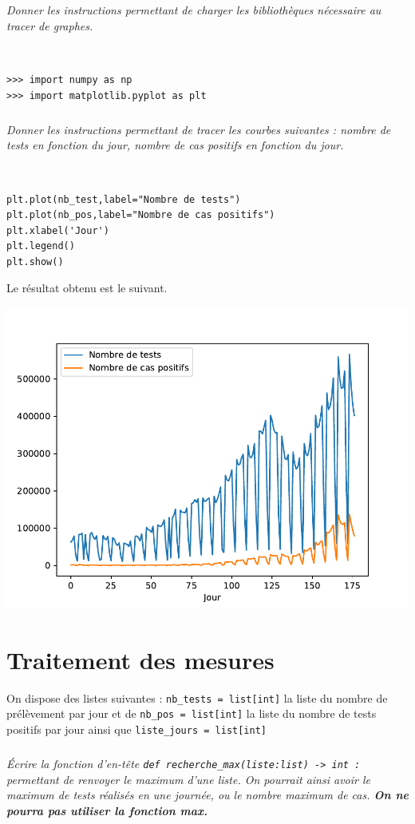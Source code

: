 \documentclass[10pt,fleqn]{article} %
\begin{document}
\subparagraph{}
\textit{Donner les instructions permettant de charger les bibliothèques nécessaire au tracer de graphes.}
\ifprof
\begin{corrige}~\\
\begin{lstlisting}
>>> import numpy as np
>>> import matplotlib.pyplot as plt
\end{lstlisting}
\end{corrige}
\else
\fi


\subparagraph{}
\textit{Donner les instructions permettant de tracer les courbes suivantes : nombre de tests en fonction du jour, nombre de cas positifs en fonction du jour.}
\ifprof
\begin{corrige}~\\
\begin{lstlisting}
plt.plot(nb_test,label="Nombre de tests")
plt.plot(nb_pos,label="Nombre de cas positifs")
plt.xlabel('Jour')
plt.legend()
plt.show()
\end{lstlisting}
\end{corrige}
\else
\fi

Le résultat obtenu est le suivant. 


\begin{center}
\includegraphics[width=.6\linewidth]{images/Figure_1.pdf}
\end{center}

\section{Traitement des mesures}
On dispose des listes suivantes : \texttt{nb\_tests = list[int]} la liste du nombre de prélèvement par jour et de \texttt{nb\_pos = list[int]} la liste du nombre de tests positifs par jour ainsi que  \texttt{liste\_jours = list[int]}

\subparagraph{}
\textit{Écrire la fonction d’en-tête \texttt{def recherche\_max(liste:list) -> int :} permettant de renvoyer le maximum d'une liste. On pourrait ainsi avoir le maximum de tests réalisés en une journée, ou le nombre maximum de cas. \textbf{On ne pourra pas utiliser la fonction max.}}
\ifprof
\begin{corrige}~\\
\begin{lstlisting}

\end{lstlisting}
\end{corrige}
\else
\fi
\end{document}
